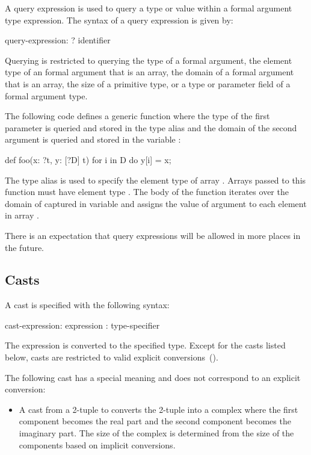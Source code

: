 A query expression is used to query a type or value within a formal
argument type expression.  The syntax of a query expression is given
by:
\begin{syntax}
query-expression:
  ? identifier
\end{syntax}
Querying is restricted to querying the type of a formal argument, the
element type of an formal argument that is an array, the domain of a
formal argument that is an array, the size of a primitive type, or a
type or parameter field of a formal argument type.
\begin{example}
The following code defines a generic function where the type of the
first parameter is queried and stored in the type alias  and
the domain of the second argument is queried and stored in the
variable :
\begin{chapel}
def foo(x: ?t, y: [?D] t) {
  for i in D do
    y[i] = x;
}
\end{chapel}
The type alias  is used to specify the element type of
array .  Arrays passed to this function must have element
type .  The body of the function iterates over the domain
of  captured in variable  and assigns the value of
argument  to each element in array .
\end{example}

There is an expectation that query expressions will be allowed in more
places in the future.

\subsection{Casts}
\label{Casts}

A cast is specified with the following syntax:
\begin{syntax}
cast-expression:
  expression : type-specifier
\end{syntax}
The expression is converted to the specified type.  Except for the
casts listed below, casts are restricted to valid explicit
conversions~().

The following cast has a special meaning and does not correspond to an
explicit conversion:
\begin{itemize}
\item {}
  A cast from a 2-tuple to  converts the 2-tuple into a
  complex where the first component becomes the real part and the
  second component becomes the imaginary part.  The size of the
  complex is determined from the size of the components based on
  implicit conversions.
\end{itemize}

